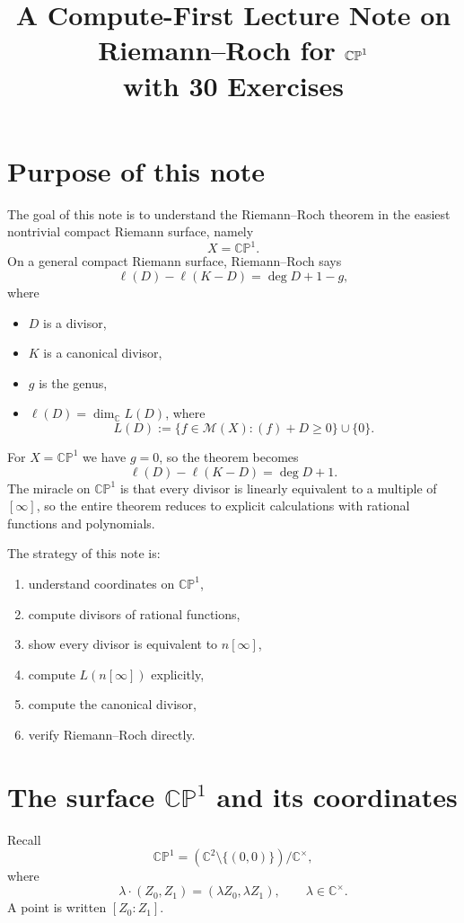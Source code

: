 \documentclass[11pt]{article}
\title{A Compute-First Lecture Note on Riemann--Roch for \texorpdfstring{$\CPone$}{CP1}\\[4pt]
with 30 Exercises}
\author{}
\date{}
\newcommand{\C}{\mathbb{C}}
\newcommand{\CP}{\mathbb{CP}}
\newcommand{\MM}{\mathcal{M}}
\newcommand{\degd}{\operatorname{deg}}
\newcommand{\CPone}{\CP^1}
\theoremstyle{definition}
\theoremstyle{plain}
\begin{document}
\maketitle
\tableofcontents

\section{Purpose of this note}
The goal of this note is to understand the Riemann--Roch theorem in the easiest nontrivial compact Riemann surface, namely
\[
X=\CPone.
\]
On a general compact Riemann surface, Riemann--Roch says
\[
\ell(D)-\ell(K-D)=\degd D+1-g,
\]
where
\begin{itemize}[leftmargin=2em]
    \item $D$ is a divisor,
    \item $K$ is a canonical divisor,
    \item $g$ is the genus,
    \item $\ell(D)=\dim_{\C} L(D)$, where
    \[
    L(D):=\{f\in \MM(X): (f)+D\ge 0\}\cup\{0\}.
    \]
\end{itemize}
For $X=\CPone$ we have $g=0$, so the theorem becomes
\[
\ell(D)-\ell(K-D)=\degd D+1.
\]
The miracle on $\CPone$ is that every divisor is linearly equivalent to a multiple of $[\infty]$, so the entire theorem reduces to explicit calculations with rational functions and polynomials.

The strategy of this note is:
\begin{enumerate}[label=\arabic*., leftmargin=2em]
    \item understand coordinates on $\CPone$,
    \item compute divisors of rational functions,
    \item show every divisor is equivalent to $n[\infty]$,
    \item compute $L(n[\infty])$ explicitly,
    \item compute the canonical divisor,
    \item verify Riemann--Roch directly.
\end{enumerate}

\section{The surface \texorpdfstring{$\CPone$}{CP1} and its coordinates}
Recall
\[
\CPone=(\C^2\setminus\{(0,0)\})/\C^\times,
\]
where
\[
\lambda\cdot (Z_0,Z_1)=(\lambda Z_0,\lambda Z_1),\qquad \lambda\in \C^\times.
\]
A point is written $[Z_0:Z_1]$.
\end{document}
